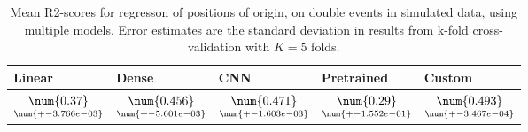\begin{table}
\centering
\caption{
Mean R2-scores for regresson of positions of origin, on double events in simulated data, using multiple models. 
Error estimates are the standard deviation in results from k-fold cross-validation 
with $K=5$ folds.
}
\label{tab:regression-simulated-double-position-r2}
\begin{tabular}{lllll}
\toprule
                                            Linear &                                               Dense &                                                 CNN &                                         Pretrained &                                              Custom \\
\midrule
 $\underset{\num{+- 3.766e-03 }  }{\num{ 0.37 } }$ &  $\underset{\num{+- 5.601e-03 }  }{\num{ 0.456 } }$ &  $\underset{\num{+- 1.603e-03 }  }{\num{ 0.471 } }$ &  $\underset{\num{+- 1.552e-01 }  }{\num{ 0.29 } }$ &  $\underset{\num{+- 3.467e-04 }  }{\num{ 0.493 } }$ \\
\bottomrule
\end{tabular}
\end{table}
